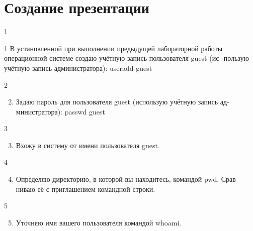 \documentclass[
  ignorenonframetext,
  aspectratio=169,
]{beamer}
\providecommand{\tightlist}{%
  \setlength{\itemsep}{0pt}\setlength{\parskip}{0pt}}\usepackage{longtable,booktabs,array}
\begin{document}
\section{Создание
презентации}\label{ux441ux43eux437ux434ux430ux43dux438ux435-ux43fux440ux435ux437ux435ux43dux442ux430ux446ux438ux438}

\begin{frame}{1}
\label{section}
\end{frame}

\begin{frame}{1}
\label{section-1}
В установленной при выполнении предыдущей лабораторной работы
операционной системе создаю учётную запись пользователя guest (ис-
пользую учётную запись администратора): useradd guest
\end{frame}

\begin{frame}{2}
\label{section-2}
\begin{enumerate}[<+->]
\setcounter{enumi}{1}
\tightlist
\item
  Задаю пароль для пользователя guest (использую учётную запись ад-
  министратора): passwd guest
\end{enumerate}
\end{frame}

\begin{frame}{3}
\label{section-3}
\begin{enumerate}[<+->]
\setcounter{enumi}{2}
\tightlist
\item
  Вхожу в систему от имени пользователя guest.
\end{enumerate}
\end{frame}

\begin{frame}{4}
\label{section-4}
\begin{enumerate}[<+->]
\setcounter{enumi}{3}
\tightlist
\item
  Определяю директорию, в которой вы находитесь, командой pwd. Срав-
  ниваю её с приглашением командной строки.
\end{enumerate}
\end{frame}

\begin{frame}{5}
\label{section-5}
\begin{enumerate}[<+->]
\setcounter{enumi}{4}
\tightlist
\item
  Уточняю имя вашего пользователя командой whoami.
\end{enumerate}
\end{frame}
\end{document}
